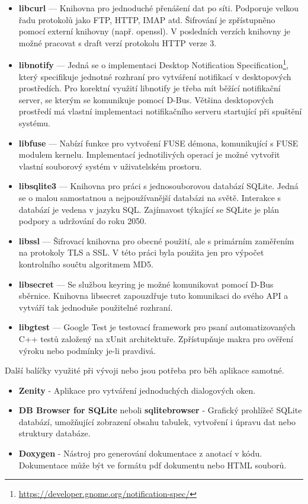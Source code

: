 \begin{itemize}
    \item \textbf{libcurl} — Knihovna pro jednoduché přenášení dat po síti. Podporuje velkou řadu protokolů jako FTP, HTTP, IMAP atd. Šifrování je zpřístupněno pomocí
    externí knihovny (např. openssl). V posledních verzích knihovny je možné pracovat s draft verzí protokolu HTTP verze 3. \cite{libcurl}
    \item \textbf{libnotify} — Jedná se o implementaci Desktop Notification Specification\footnote{\url{https://developer.gnome.org/notification-spec/}}, který specifikuje
    jednotné rozhraní pro vytváření notifikací v desktopových prostředích. Pro korektní využití libnotify je třeba mít běžící notifikační server, se kterým se komunikuje
    pomocí D-Bus. Většina desktopových prostředí má vlastní implementaci notifikačního serveru startující při spuštění systému. \cite{libnotify}
    \item \textbf{libfuse} — Nabízí funkce pro vytvoření FUSE démona, komunikující s FUSE modulem kernelu. Implementací jednotilivých operací je možné vytvořit vlastní
    souborový systém v uživatelském prostoru. \cite{libfuse}
    \item \textbf{libsqlite3} — Knihovna pro práci s jednosouborovou databází SQLite. Jedná se o malou samostatnou a nejpoužívanější databázi na světě. Interakce s databází
    je vedena v jazyku SQL. Zajímavost týkající se SQLite je plán podpory a udržování do roku 2050. \cite{libsqlite}
    \item \textbf{libssl} — Šifrovací knihovna pro obecné použití, ale s primárním zaměřením na protokoly TLS a SSL. V této práci byla použita jen pro výpočet kontrolního
    součtu algoritmem MD5. \cite{libssl}
    \item \textbf{libsecret} — Se službou keyring je možné komunikovat pomocí D-Bus sběrnice. Knihovna libsecret zapouzdřuje tuto komunikaci do svého API a vytváří tak
    jednoduše použitelné rozhraní. \cite{libsecret}
    \item \textbf{libgtest} — Google Test je testovací framework pro psaní automatizovaných C++ testů založený na xUnit architektuře. Zpřístupňuje makra pro ověření
    výroku nebo podmínky je-li pravdivá. \cite{libgtest}
\end{itemize}

\noindent Další balíčky využité při vývoji nebo jsou potřeba pro běh aplikace samotné.

\begin{itemize}
    \item \textbf{Zenity} - Aplikace pro vytváření jednoduchých dialogových oken.
    \item \textbf{DB Browser for SQLite} neboli \textbf{sqlitebrowser} - Grafický prohlížeč SQLite databází, umožňující zobrazení obsahu tabulek, vytvoření i úpravu dat
    nebo struktury databáze.
    \item \textbf{Doxygen} - Nástroj pro generování dokumentace z anotací v kódu. Dokumentace může být ve formátu pdf dokumentu nebo HTML souborů.
\end{itemize}

